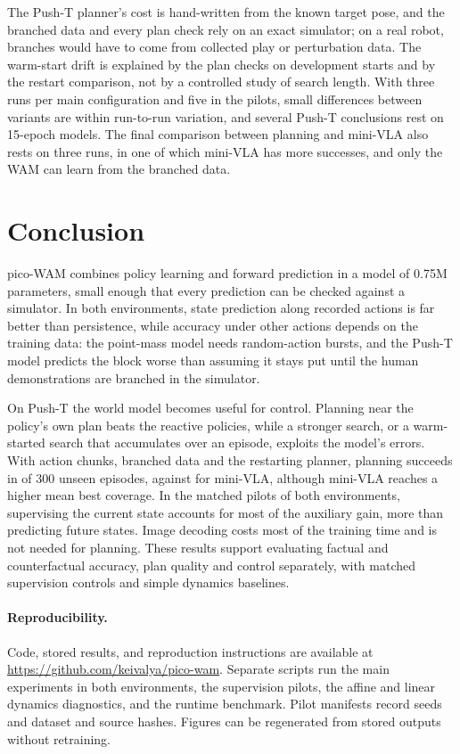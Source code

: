 \documentclass[11pt]{article}
\begin{document}
The Push-T planner's cost is hand-written from the known target pose, and the branched data and every plan check rely on an exact simulator; on a real robot, branches would have to come from collected play or perturbation data. The warm-start drift is explained by the plan checks on development starts and by the restart comparison, not by a controlled study of search length. With three runs per main configuration and five in the pilots, small differences between variants are within run-to-run variation, and several Push-T conclusions rest on 15-epoch models. The final comparison between planning and mini-VLA also rests on three runs, in one of which mini-VLA has more successes, and only the WAM can learn from the branched data.

\section{Conclusion}

pico-WAM combines policy learning and forward prediction in a model of 0.75M parameters, small enough that every prediction can be checked against a simulator. In both environments, state prediction along recorded actions is far better than persistence, while accuracy under other actions depends on the training data: the point-mass model needs random-action bursts, and the Push-T model predicts the block worse than assuming it stays put until the human demonstrations are branched in the simulator.

On Push-T the world model becomes useful for control. Planning near the policy's own plan beats the reactive policies, while a stronger search, or a warm-started search that accumulates over an episode, exploits the model's errors. With action chunks, branched data and the restarting planner, planning succeeds in \PTfinalPlanSucc{} of 300 unseen episodes, against \PTfinalVlaSucc{} for mini-VLA, although mini-VLA reaches a higher mean best coverage.
In the matched pilots of both environments, supervising the current state accounts for most of the auxiliary gain, more than predicting future states. Image decoding costs most of the training time and is not needed for planning. These results support evaluating factual and counterfactual accuracy, plan quality and control separately, with matched supervision controls and simple dynamics baselines.

\paragraph{Reproducibility.} Code, stored results, and reproduction instructions are available at \url{https://github.com/keivalya/pico-wam}. Separate scripts run the main experiments in both environments, the supervision pilots, the affine and linear dynamics diagnostics, and the runtime benchmark. Pilot manifests record seeds and dataset and source hashes. Figures can be regenerated from stored outputs without retraining.
\end{document}
